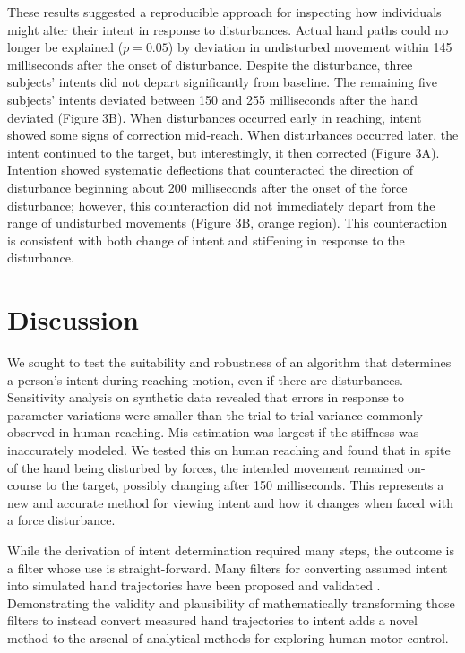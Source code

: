 These results suggested a reproducible approach for inspecting how individuals might alter their intent in response to disturbances. Actual hand paths could no longer be explained ($p=0.05$) by deviation in undisturbed movement within 145 milliseconds after the onset of disturbance. Despite the disturbance, three subjects' intents did not depart significantly from baseline. The remaining five subjects' intents deviated between 150 and 255 milliseconds after the hand deviated (Figure 3B). When disturbances occurred early in reaching, intent showed some signs of correction mid-reach. When disturbances occurred later, the intent continued to the target, but interestingly, it then corrected (Figure 3A). Intention showed systematic deflections that counteracted the direction of disturbance beginning about 200 milliseconds after the onset of the force disturbance; however, this counteraction did not immediately depart from the range of undisturbed movements (Figure 3B, orange region). This counteraction is consistent with both change of intent and stiffening in response to the disturbance.

\section*{Discussion}
We sought to test the suitability and robustness of an algorithm that determines a person's intent during reaching motion, even if there are disturbances. Sensitivity analysis on synthetic data revealed that errors in response to parameter variations were smaller than the trial-to-trial variance commonly observed in human reaching. Mis-estimation was largest if the stiffness was inaccurately modeled. We tested this on human reaching and found that in spite of the hand being disturbed by forces, the intended movement remained on-course to the target, possibly changing after 150 milliseconds. This represents a new and accurate method for viewing intent and how it changes when faced with a force disturbance.

While the derivation of intent determination required many steps, the outcome is a filter whose use is straight-forward. Many filters for converting assumed intent into simulated hand trajectories have been proposed and validated \cite{shadmehr1994adaptive, franklin2003adaptation, burdet2006stability}. Demonstrating the validity and plausibility of mathematically transforming those filters to instead convert measured hand trajectories to intent adds a novel method to the arsenal of analytical methods for exploring human motor control.

